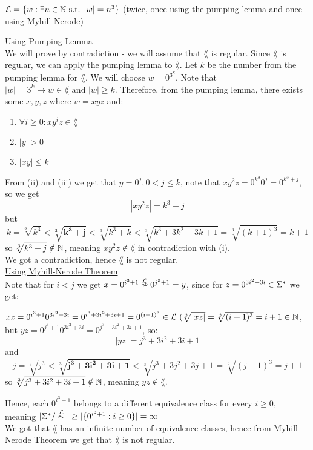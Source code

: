 $\mathcal{L}=\{w : \exists n \in \mathbb{N} \text{ s.t. } |w| = n^3\}$
(twice, once using the pumping lemma and once using Myhill-Nerode)

\underline{Using Pumping Lemma} \\

We will prove by contradiction - we will assume that $\lang$ is regular.
Since $\lang$ is regular, we can apply the pumping lemma to $\lang$. Let $k$
be the number from the pumping lemma for $\lang$. We will choose $w = 0^{3^k}$.
Note that $|w|=3^k \rightarrow w \in \lang \text{ and } |w| \geq k$.
Therefore, from the pumping lemma, there exists some $x, y, z$ where $w = xyz$ and:

\begin{enumerate}
    \item $\forall i \geq 0: x y^i z \in \lang$
    \item $|y| > 0$
    \item $|xy| \leq k$
\end{enumerate}

From (ii) and (iii) we get that $y=0^j, 0 < j \leq k$,
note that $x y^2 z = 0^{k^3} 0^j = 0^{k^3+j}$,
so we get
\[
    |x y^2 z| = k^3+j
\]
but
\[
    k = \sqrt[3]{k^3} < \boldsymbol{\sqrt[3]{k^3+j}} < \sqrt[3]{k^3+k} < \sqrt[3]{k^3+3k^2+3k+1} = \sqrt[3]{(k+1)^3} = k+1
\]
so $\sqrt[3]{k^3+j} \notin \mathbb{N}$, meaning $x y^2 z \notin \lang$ in contradiction with (i). \\
We got a contradiction, hence $\lang$ is not regular. \\


\underline{Using Myhill-Nerode Theorem} \\

Note that for $i < j$ we get $x = 0^{i^3+1} \overset{\mathcal{L}}{\nsim} 0^{j^3+1}  = y$,
since for $z=0^{3i^2+3i} \in \Sigma^*$ we get:

$xz = 0^{i^3+1}0^{3i^2+3i}=0^{i^3+3i^2+3i+1}=0^{(i+1)^3} \in \mathcal{L} \text{ } (\sqrt[3]{|xz|}=\sqrt[3]{(i+1)^3}=i+1 \in \mathbb{N}$, \\
but $yz = 0^{j^3+1}0^{3i^2+3i}=0^{j^3+3i^2+3i+1}$, so:
\[
    |yz| = j^3+3i^2+3i+1
\]
and
\[
    j = \sqrt[3]{j^3} < \boldsymbol{\sqrt[3]{j^3+3i^2+3i+1}} < \sqrt[3]{j^3+3j^2+3j+1} = \sqrt[3]{(j+1)^3} = j+1
\]
so $\sqrt[3]{j^3+3i^2+3i+1} \notin \mathbb{N}$, meaning $yz \notin \lang$.

Hence, each $ 0^{i^3+1} $ belongs to a different equivalence class for every $i \geq 0$, \\
meaning $|\Sigma^* / \overset{\mathcal{L}}{\thicksim}| \geq |\{0^{i^3+1}: i \geq 0\}| = \infty$ \\
We got that $\lang$ has an infinite number of equivalence classes, hence from
Myhill-Nerode Theorem we get that $\lang$ is not regular. \\